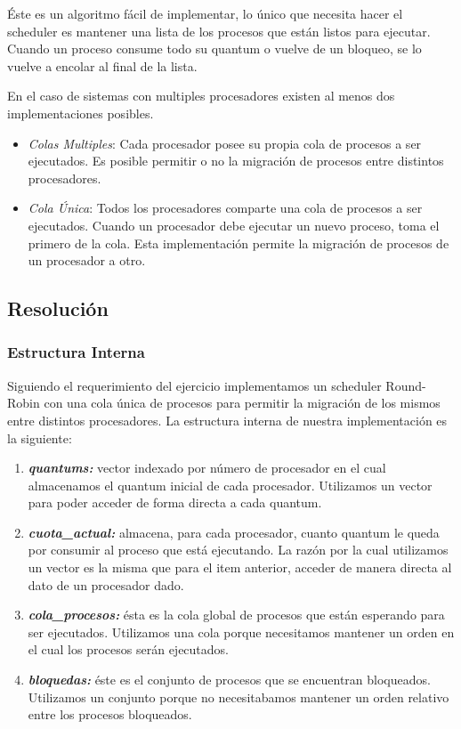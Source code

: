 \documentclass[a4paper,11pt]{article}
\begin{document}
		Éste es un algoritmo fácil de implementar, lo único que necesita hacer el scheduler es mantener una lista de los procesos que están listos para ejecutar. Cuando un proceso consume todo su quantum o vuelve de un bloqueo, se lo vuelve a encolar al final de la lista.
		
		En el caso de sistemas con multiples procesadores existen al menos dos implementaciones posibles.
	
		\begin{itemize}
			\item \emph{Colas Multiples}: Cada procesador posee su propia cola de procesos a ser ejecutados. Es posible permitir o no la migración de procesos entre distintos procesadores.
			\item \emph{Cola Única}: Todos los procesadores comparte una cola de procesos a ser ejecutados. Cuando un procesador debe ejecutar un nuevo proceso, toma el primero de la cola. Esta implementación permite la migración de procesos de un procesador a otro.
		\end{itemize}
	
	\subsection{Resolución}
		\subsubsection*{Estructura Interna}
			Siguiendo el requerimiento del ejercicio implementamos un scheduler Round-Robin con una cola única de procesos para permitir la migración de los mismos entre distintos procesadores.
			La estructura interna de nuestra implementación es la siguiente:
			

			\begin{enumerate}
				\item \emph{\textbf{quantums:}} vector indexado por número de procesador en el cual almacenamos el quantum inicial de cada procesador. Utilizamos un vector para poder acceder de forma directa a cada quantum.
				\item \emph{\textbf{cuota\_actual:}} almacena, para cada procesador, cuanto quantum le queda por consumir al proceso que está ejecutando. La razón por la cual utilizamos un vector es la misma que para el item anterior, acceder de manera directa al dato de un procesador dado.
				\item \emph{\textbf{cola\_procesos:}} ésta es la cola global de procesos que están esperando para ser ejecutados. Utilizamos una cola porque necesitamos mantener un orden en el cual los procesos serán ejecutados.
				\item \emph{\textbf{bloquedas:}} éste es el conjunto de procesos que se encuentran bloqueados. Utilizamos un conjunto porque no necesitabamos mantener un orden relativo entre los procesos bloqueados.
			\end{enumerate}
\end{document}
